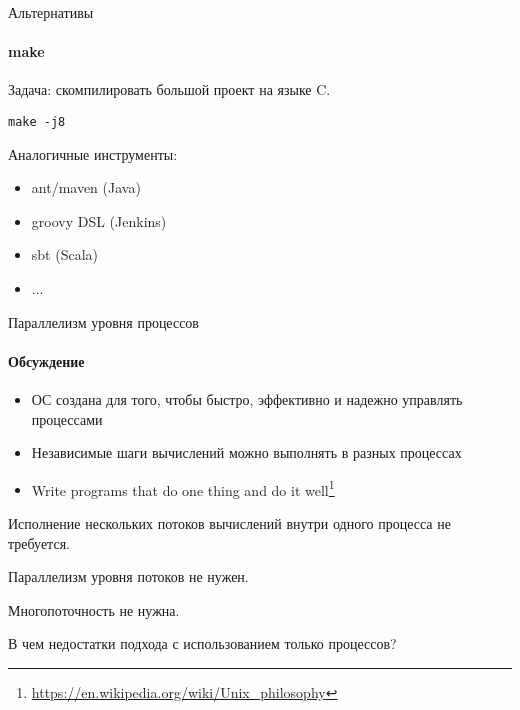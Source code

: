 \begin{frame}[fragile]{Альтернативы}
\framesubtitle{make}

Задача: скомпилировать большой проект на языке C.

\pause

\begin{lstlisting}
make -j8
\end{lstlisting}

\pause

Аналогичные инструменты: 
\begin{itemize}
    \item ant/maven (Java)
    \item groovy DSL (Jenkins)
    \item sbt (Scala)
    \item ...
\end{itemize}

\end{frame}

\begin{frame}{Параллелизм уровня процессов}
\framesubtitle{Обсуждение}

\begin{itemize}
 \pause
 \item ОС создана для того, чтобы быстро, эффективно и надежно управлять процессами
 \pause
 \item Независимые шаги вычислений можно выполнять в разных процессах
 \pause
 \item Write programs that do one thing and do it well\footnote<4->{\tiny\url{https://en.wikipedia.org/wiki/Unix_philosophy}}
\end{itemize}

\pause
Исполнение нескольких потоков вычислений внутри одного процесса не требуется.

\pause 
Параллелизм уровня потоков не нужен.

\pause
Многопоточность не нужна.

\pause
В чем недостатки подхода с использованием только процессов?

\end{frame}


